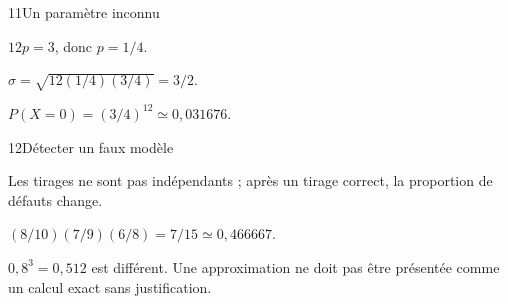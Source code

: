 \begin{corrige}{11}{Un paramètre inconnu}
\begin{questions}
\item $12p=3$, donc $p=1/4$.
\item $\sigma=\sqrt{12(1/4)(3/4)}=3/2$.
\item $P(X=0)=(3/4)^{12}\simeq0{,}031676$.
\end{questions}
\end{corrige}
\begin{corrige}{12}{Détecter un faux modèle}
\begin{questions}
\item Les tirages ne sont pas indépendants ; après un tirage correct, la proportion de défauts change.
\item $(8/10)(7/9)(6/8)=7/15\simeq0{,}466667$.
\item $0{,}8^3=0{,}512$ est différent. Une approximation ne doit pas être présentée comme un calcul exact sans justification.
\end{questions}
\end{corrige}
